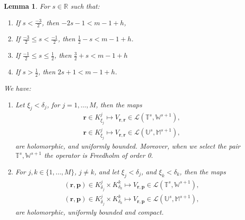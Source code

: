 \documentclass{article}
\newtheorem{lemma}[theorem]{Lemma}
\newcommand{\IM}{{\mathbb M}}
\newcommand{\IR}{{\mathbb R}}
\newcommand{\IU}{{\mathbb U}}
\newcommand{\IT}{{\mathbb T}}
\newcommand{\IW}{{\mathbb W}}
\newcommand{\bp}{{\bm p}}
\newcommand{\br}{\bm{r}}
\begin{document}
\begin{lemma}
\label{lemma:vcomp}For $s\in \IR$ such that:
\begin{enumerate}
\item[i] 
If $s < \frac{-3}{2}$, then $-2s-1<m-1+h$,
\item[ii] 
If $\frac{-3}{2} \leq s < \frac{-1}{2}$, then $\frac{1}{2} -s < m-1+h$.
\item[iii] 
If $\frac{-1}{2} \leq s \leq \frac{1}{2}$, then $\frac{3}{2}+s< m-1 +h$
\item[iv] 
If $s> \frac{1}{2}$, then $2s +1 < m -1 +h $.
\end{enumerate}
We have:
\begin{enumerate}
\item  Let $\xi_j< \delta_j$, for $j=1,\hdots,M$, then the maps
\begin{align*}
\br \in K^j_{\xi_j} \mapsto V_{\br,\br} \in 
\mathcal{L}(\IT^s, \IW^{s+1}), \\
\br \in K^j_{\xi_j} \mapsto V_{\br,\br} \in 
\mathcal{L}(\IU^s, \IM^{s+1}),
\end{align*} 
are holomorphic, and uniformly bounded. Moreover, when we select the pair $\IT^s,\IW^{s+1}$ the operator is Freedholm of order 0. 
\item 
For $j,k \in \{1,\hdots,M\}$, $j \neq k$,  and let $\xi_j < \delta_j$, and $\xi_k  < \delta_k$, then the maps 
\begin{align*}
 (\br,\bp) \in K^j_{\delta_j} \times K^k_{\delta_k} \mapsto V_{\br,\bp} \in 
\mathcal{L}(\IT^s, \IW^{s+1}),\\
 (\br,\bp) \in K^j_{\delta_j} \times K^k_{\delta_k} \mapsto V_{\br,\bp} \in 
\mathcal{L}(\IU^s, \IM^{s+1}),
\end{align*}
are holomorphic, uniformly bounded and compact. 
\end{enumerate}
\end{lemma}
\end{document}
